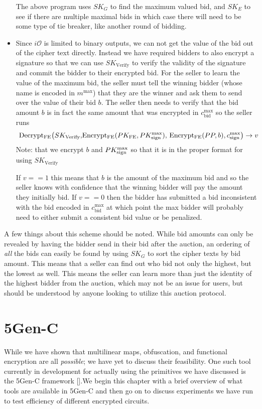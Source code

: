 \documentclass[12pt,twoside]{reedthesis}
\begin{document}
\begin{itemize}
	The above program uses $SK_G$ to find the maximum valued bid, and $SK_E$ to see if there are multiple maximal bids in which case there will need to be some type of tie breaker, like another round of bidding. 
	\item Since $i\mathcal{O}$ is limited to binary outputs, we can not get the value of the bid out of the cipher text directly. Instead we have required bidders to also encrypt a signature so that we can use $SK_\text{Verify}$ to verify the validity of the signature and commit the bidder to their encrypted bid. For the seller to learn the value of the maximum bid, the seller must tell the winning bidder (whose name is encoded in $m^\text{max}$) that they are the winner and ask them to send over the value of their bid $b$. The seller then needs to verify that the bid amount $b$ is in fact the same amount that was encrypted in $c^\text{max}_\text{bid}$ so the seller runs $$\text{ Decrypt$_\text{FE}\big(SK_\text{Verify},$Encrypt$_\text{FE}(PK_\text{FE},PK_\text{sign}^\text{max}),$ Encrypt$_\text{FE}(PP, b),c_\text{sign}^\text{max}$\big)} \to v $$
Note: that we encrypt $b$ and $PK_\text{sign}^\text{max}$ so that it is in the proper format for using $SK_\text{Verify}$

\par If $v==1$ this means that $b$ is the amount of the maximum bid and so the seller knows with confidence that the winning bidder will pay the amount they initially bid. If $v == 0$ then the bidder has submitted a bid inconsistent with the bid encoded in $c_\text{bid}^\text{max}$ at which point the max bidder will probably need to either submit a consistent bid value or be penalized.
       \end{itemize}
       
       \par A few things about this scheme should be noted. While bid amounts can only be revealed by having the bidder send in their bid after the auction, an ordering of \textit{all} the bids can easily be found by using $SK_G$ to sort the cipher texts by bid amount. This means that a seller can find out who bid not only the highest, but the lowest as well. This means the seller can learn more than just the identity of the highest bidder from the auction, which may not be an issue for users, but should be understood by anyone looking to utilize this auction protocol.    
    
    
    
    
    
    \chapter{5Gen-C}
    \par While we have shown that multilinear maps, obfuscation, and functional encryption are all \textit{possible}; we have yet to discuss their feasibility. One such tool currently in development for actually using the primitives we have discussed is the 5Gen-C framework [\cite{5genc}].We begin this chapter with a brief overview of what tools are available in 5Gen-C and then go on to discuss experiments we have run to test efficiency of different encrypted circuits. 
    
\end{document}
